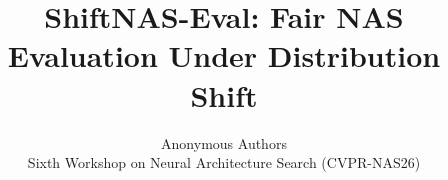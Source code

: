 \documentclass[10pt,twocolumn,letterpaper]{article}
\title{ShiftNAS-Eval: Fair NAS Evaluation Under Distribution Shift}
\author{Anonymous Authors\\
Sixth Workshop on Neural Architecture Search (CVPR-NAS26)
}
\begin{document}
\maketitle








{
    \small
    
    
}
\end{document}
